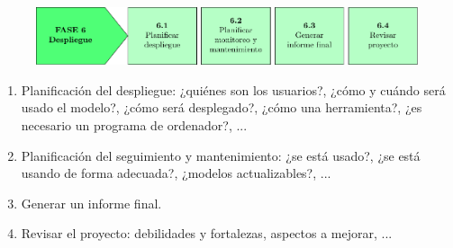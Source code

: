 \begin{figure}[H]
\centering
\includegraphics[width=\textwidth]{fotos/18.pdf}
\end{figure}

\begin{enumerate}[label=6.\arabic*]
\item Planificación del despliegue: ¿quiénes son los usuarios?, ¿cómo y cuándo será usado el modelo?, ¿cómo será desplegado?, ¿cómo una herramienta?, ¿es necesario un programa de ordenador?, ... 
\item Planificación del seguimiento y mantenimiento: ¿se está usado?, ¿se está usando de forma adecuada?, ¿modelos actualizables?, ...
\item Generar un informe final.
\item Revisar el proyecto: debilidades y fortalezas, aspectos a mejorar, ...
\end{enumerate}